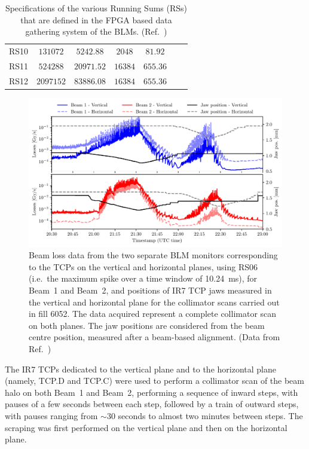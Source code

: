 \begin{table}[t]
{\begin{tabular}{c|c|c|c|c|c|c}
        RS10 & $131072$ & $5242.88$ & $2048$ & $81.92$ & & \\
        RS11 & $524288$ & $20971.52$ & $16384$ & $655.36$ & & \\
        RS12 & $2097152$ & $83886.08$ & $16384$ & $655.36$ & & \\
    \bottomrule
    \end{tabular}
    }
    \caption{Specifications of the various Running Sums (RSs) that are defined in the FPGA based data gathering system of the BLMs. (Ref.~\cite{rsdeftable})}
    \label{tab:rs_scheme}
\end{table}

\begin{figure}[t]
    \centering
    \includegraphics[width=\textwidth]{5_Diffusion_measurement_LHC/figs/raw.pdf}
    \caption{Beam loss data from the two separate BLM monitors corresponding to the TCPs on the vertical and horizontal planes, using RS06 (i.e.\ the maximum spike over a time window of \SI{10.24}{ms}), for Beam~1 and Beam~2, and positions of IR7 TCP jaws measured in the vertical and horizontal plane for the collimator scans carried out in fill 6052. The data acquired represent a complete collimator scan on both planes. The jaw positions are considered from the beam centre position, measured after a beam-based alignment. (Data from Ref.~\cite{PhysRevAccelBeams.23.044802})}
    \label{fig:raw_data}
\end{figure}

The IR7 TCPs dedicated to the vertical plane and to the horizontal plane (namely, TCP.D and TCP.C) were used to perform a collimator scan of the beam halo on both Beam~1 and Beam~2, performing a sequence of inward steps, with pauses of a few seconds between each step, followed by a train of outward steps, with pauses ranging from $\sim30$ seconds to almost two minutes between steps. The scraping was first performed on the vertical plane and then on the horizontal plane. 

